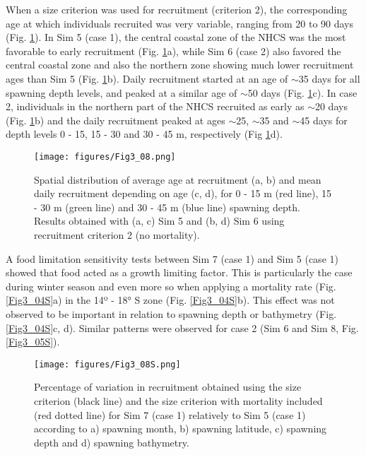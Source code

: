 When a size criterion was used for recruitment (criterion 2), the corresponding age at which individuals recruited was very variable, ranging from 20 to 90 days (Fig. \ref{Fig3_08}). In Sim 5 (case 1), the central coastal zone of the NHCS was the most favorable to early recruitment (Fig. \ref{Fig3_08}a), while Sim 6 (case 2) also favored the central coastal zone and also the northern zone showing much lower recruitment ages than Sim 5 (Fig. \ref{Fig3_08}b). Daily recruitment started at an age of $\sim$35 days for all spawning depth levels, and peaked at a similar age of $\sim$50 days (Fig. \ref{Fig3_08}c). In case 2, individuals in the northern part of the NHCS recruited as early as $\sim$20 days (Fig. \ref{Fig3_08}b) and the daily recruitment peaked at ages $\sim$25, $\sim$35 and $\sim$45 days for depth levels 0 - 15, 15 - 30 and 30 - 45 m, respectively (Fig \ref{Fig3_08}d).\\

\begin{figure}[ht]
	\texttt{[image: figures/Fig3\_08.png]}
	\centering
	\caption{Spatial distribution of average age at recruitment (a, b) and mean daily recruitment depending on age (c, d), for 0 - 15 m (red line), 15 - 30 m (green line) and 30 - 45 m (blue line) spawning depth. Results obtained with (a, c) Sim 5 and (b, d) Sim 6 using recruitment criterion 2 (no mortality).}
	\label{Fig3_08}
\end{figure}

A food limitation sensitivity tests between Sim 7 (case 1) and Sim 5 (case 1) showed that food acted as a growth limiting factor. This is particularly the case during winter season and even more so when applying a mortality rate (Fig. \ref{Fig3_04S}a) in the 14º - 18° S zone (Fig. \ref{Fig3_04S}b). This effect was not observed to be important in relation to spawning depth or bathymetry (Fig. \ref{Fig3_04S}c, d). Similar patterns were observed for case 2 (Sim 6 and Sim 8, Fig. \ref{Fig3_05S}).\\

\begin{figure}[ht]
	\texttt{[image: figures/Fig3\_08S.png]}
	\centering
	\caption{Percentage of variation in recruitment obtained using the size criterion (black line) and the size criterion with mortality included (red dotted line) for Sim 7 (case 1) relatively to Sim 5 (case 1) according to a) spawning month, b) spawning latitude, c) spawning depth and d) spawning bathymetry.}
	\label{Fig3_08S}
\end{figure}


